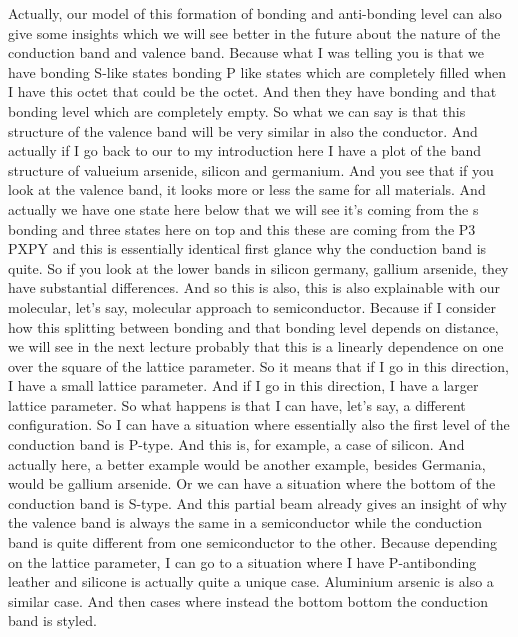 Actually, our model of this formation of bonding and anti-bonding level can also give some insights which we will see better in the future about the nature of the conduction band and valence band. Because what I was telling you is that we have bonding S-like states bonding P like states which are completely filled when I have this octet that could be the octet. And then they have bonding and that bonding level which are completely empty. So what we can say is that this structure of the valence band will be very similar in also the conductor. And actually if I go back to our to my introduction here I have a plot of the band structure of valueium arsenide, silicon and germanium. And you see that if you look at the valence band, it looks more or less the same for all materials. And actually we have one state here below that we will see it's coming from the s bonding and three states here on top and this these are coming from the P3 PXPY and this is essentially identical first glance why the conduction band is quite. So if you look at the lower bands in silicon germany, gallium arsenide, they have substantial differences. And so this is also, this is also explainable with our molecular, let's say, molecular approach to semiconductor. Because if I consider how this splitting between bonding and that bonding level depends on distance, we will see in the next lecture probably that this is a linearly dependence on one over the square of the lattice parameter. So it means that if I go in this direction, I have a small lattice parameter. And if I go in this direction, I have a larger lattice parameter. So what happens is that I can have, let's say, a different configuration. So I can have a situation where essentially also the first level of the conduction band is P-type. And this is, for example, a case of silicon. And actually here, a better example would be another example, besides Germania, would be gallium arsenide. Or we can have a situation where the bottom of the conduction band is S-type. And this partial beam already gives an insight of why the valence band is always the same in a semiconductor while the conduction band is quite different from one semiconductor to the other. Because depending on the lattice parameter, I can go to a situation where I have P-antibonding leather and silicone is actually quite a unique case. Aluminium arsenic is also a similar case. And then cases where instead the bottom bottom the conduction band is styled.\\
